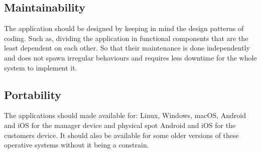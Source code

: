 \subsection{Maintainability}
The application should be designed by keeping in mind the design patterns of coding. Such as, dividing the application in functional components that are the least dependent on each other. So that their maintenance is done independently and does not spawn irregular behaviours and requires less downtime for the whole system to implement it. 

\subsection{Portability}
The applications should made available for:
Linux, Windows, macOS, Android and iOS for the manager device and physical spot
Android and iOS for the customers device. 
It should also be available for some older versions of these operative systems without it being a constrain. 

